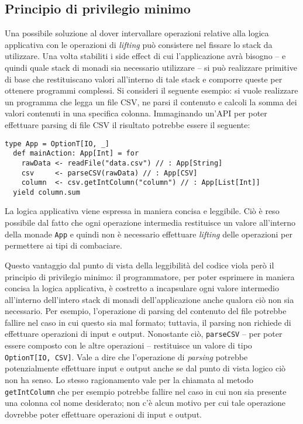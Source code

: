 \subsection{Principio di privilegio minimo}
Una possibile soluzione al dover intervallare operazioni relative alla logica applicativa con le operazioni di \emph{lifting} può consistere nel fissare lo stack da utilizzare. Una volta stabiliti i side effect di cui l'applicazione avrà bisogno -- e quindi quale stack di monadi sia necessario utilizzare -- si può realizzare primitive di base che restituiscano valori all'interno di tale stack e comporre queste per ottenere programmi complessi. Si consideri il seguente esempio: si vuole realizzare un programma che legga un file CSV, ne parsi il contenuto e calcoli la somma dei valori contenuti in una specifica colonna. Immaginando un'API per poter effettuare parsing di file CSV il risultato potrebbe essere il seguente:
\begin{lstlisting}[language=scala3]
  type App = OptionT[IO, _]
  def mainAction: App[Int] = for
    rawData <- readFile("data.csv") // : App[String]
    csv     <- parseCSV(rawData) // : App[CSV]
    column  <- csv.getIntColumn("column") // : App[List[Int]]
  yield column.sum
\end{lstlisting}
La logica applicativa viene espressa in maniera concisa e leggibile. Ciò è reso possibile dal fatto che ogni operazione intermedia restituisce un valore all'interno della monade \lstinline{App} e quindi non è necessario effettuare \emph{lifting} delle operazioni per permettere ai tipi di combaciare.

Questo vantaggio dal punto di vista della leggibilità del codice viola però il principio di privilegio minimo: il programmatore, per poter esprimere in maniera concisa la logica applicativa, è costretto a incapsulare ogni valore intermedio all'interno dell'intero stack di monadi dell'applicazione anche qualora ciò non sia necessario. Per esempio, l'operazione di parsing del contenuto del file potrebbe fallire nel caso in cui questo sia mal formato; tuttavia, il parsing non richiede di effettuare operazioni di input e output. Nonostante ciò, \lstinline{parseCSV} -- per poter essere composto con le altre operazioni -- restituisce un valore di tipo \lstinline{OptionT[IO, CSV]}. Vale a dire che l'operazione di \emph{parsing} potrebbe potenzialmente effettuare input e output anche se dal punto di vista logico ciò non ha senso.
Lo stesso ragionamento vale per la chiamata al metodo \lstinline{getIntColumn} che per esempio potrebbe fallire nel caso in cui non sia presente una colonna col nome desiderato; non c'è alcun motivo per cui tale operazione dovrebbe poter effettuare operazioni di input e output.

